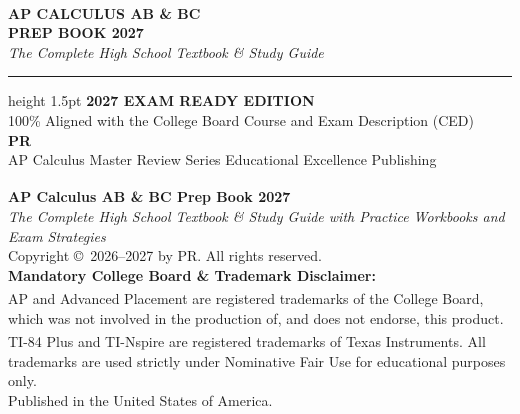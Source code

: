 ﻿\documentclass[11pt,oneside,openany]{book}
\newcommand{\BookTitle}{AP\textsuperscript{\textregistered} Calculus AB \& BC Prep Book 2027}
\newcommand{\BookSubtitle}{The Complete High School Textbook \& Study Guide with Practice Workbooks and Exam Strategies}
\newcommand{\BookAuthor}{PR}
\begin{document}
\begin{titlepage}
\begin{center}
\vspace*{0.8in}
{\Huge\bfseries\color{RoyalNavy} AP\textsuperscript{\textregistered} CALCULUS AB \& BC}\\[0.2in]
{\Large\bfseries\color{SkyBlue} PREP BOOK 2027}\\[0.15in]
{\large\itshape\color{SlateMuted} The Complete High School Textbook \& Study Guide}\\[0.4in]
\hrule height 1.5pt
\vspace*{0.3in}
{\bfseries\color{AmberGold} 2027 EXAM READY EDITION}\\[0.1in]
{\small 100\% Aligned with the College Board Course and Exam Description (CED)}\\[1.5in]
{\large\bfseries \BookAuthor}\\[0.1in]
{\small AP Calculus Master Review Series}
\vfill
{\footnotesize Educational Excellence Publishing}
\end{center}
\end{titlepage}

\newpage
\thispagestyle{empty}
\vspace*{\fill}
\begin{flushleft}
\textbf{\BookTitle}\\
\textit{\BookSubtitle}\\
Copyright \copyright\ 2026--2027 by \BookAuthor. All rights reserved.\\[0.15in]

\textbf{Mandatory College Board \& Trademark Disclaimer:}\\
AP\textsuperscript{\textregistered} and Advanced Placement\textsuperscript{\textregistered} are registered trademarks of the College Board, which was not involved in the production of, and does not endorse, this product. TI-84 Plus\textsuperscript{\textregistered} and TI-Nspire\textsuperscript{\textregistered} are registered trademarks of Texas Instruments. All trademarks are used strictly under Nominative Fair Use for educational purposes only.\\[0.15in]

Published in the United States of America.
\end{flushleft}
\vspace*{0.5in}

\newpage
\tableofcontents

\end{document}
